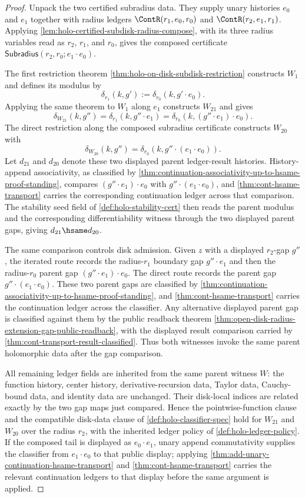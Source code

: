 \begin{proof}
Unpack the two certified subradius data. They supply unary histories $e_0$ and $e_1$ together with radius ledgers $\ContR(r_1,e_0,r_0)$ and $\ContR(r_2,e_1,r_1)$. Applying \autoref{lem:holo-certified-subdisk-radius-compose}, with its three radius variables read as $r_2$, $r_1$, and $r_0$, gives the composed certificate $\mathsf{Subradius}(r_2,r_0;e_1\cdot e_0)$.

The first restriction theorem \autoref{thm:holo-on-disk-subdisk-restriction} constructs $W_1$ and defines its modulus by
$$
\delta_{r_1}(k,g'):=\delta_{r_0}(k,g'\cdot e_0).
$$
Applying the same theorem to $W_1$ along $e_1$ constructs $W_{21}$ and gives
$$
\delta_{W_{21}}(k,g'')=
\delta_{r_1}(k,g''\cdot e_1)=
\delta_{r_0}(k,(g''\cdot e_1)\cdot e_0).
$$
The direct restriction along the composed subradius certificate constructs $W_{20}$ with
$$
\delta_{W_{20}}(k,g'')=
\delta_{r_0}(k,g''\cdot(e_1\cdot e_0)).
$$
Let $d_{21}$ and $d_{20}$ denote these two displayed parent ledger-result histories. History-append associativity, as classified by \autoref{thm:continuation-associativity-up-to-hsame-proof-standing}, compares $(g''\cdot e_1)\cdot e_0$ with $g''\cdot(e_1\cdot e_0)$, and \autoref{thm:cont-hsame-transport} carries the corresponding continuation ledger across that comparison. The stability seed field of \autoref{def:holo-stability-cert} then reads the parent modulus and the corresponding differentiability witness through the two displayed parent gaps, giving $d_{21}\hsame d_{20}$.

The same comparison controls disk admission. Given $z$ with a displayed $r_2$-gap $g''$, the iterated route records the radius-$r_1$ boundary gap $g''\cdot e_1$ and then the radius-$r_0$ parent gap $(g''\cdot e_1)\cdot e_0$. The direct route records the parent gap $g''\cdot(e_1\cdot e_0)$. These two parent gaps are classified by \autoref{thm:continuation-associativity-up-to-hsame-proof-standing}, and \autoref{thm:cont-hsame-transport} carries the continuation ledger across the classifier. Any alternative displayed parent gap is classified against them by the public readback theorem \autoref{thm:open-disk-radius-extension-gap-public-readback}, with the displayed result comparison carried by \autoref{thm:cont-transport-result-classified}. Thus both witnesses invoke the same parent holomorphic data after the gap comparison.

All remaining ledger fields are inherited from the same parent witness $W$: the function history, center history, derivative-recursion data, Taylor data, Cauchy-bound data, and identity data are unchanged. Their disk-local indices are related exactly by the two gap maps just compared. Hence the pointwise-function clause and the compatible disk-data clause of \autoref{def:holo-classifier-spec} hold for $W_{21}$ and $W_{20}$ over the radius $r_2$, with the inherited ledger policy of \autoref{def:holo-ledger-policy}. If the composed tail is displayed as $e_0\cdot e_1$, unary append commutativity supplies the classifier from $e_1\cdot e_0$ to that public display; applying \autoref{thm:add-unary-continuation-hsame-transport} and \autoref{thm:cont-hsame-transport} carries the relevant continuation ledgers to that display before the same argument is applied.
\end{proof}
